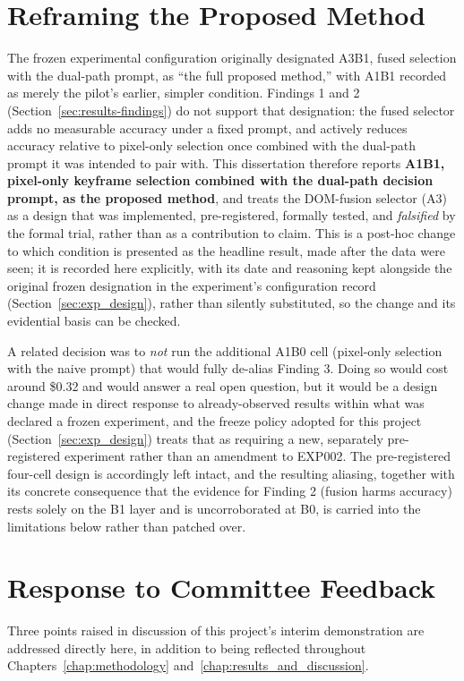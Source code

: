 \section{Reframing the Proposed Method}
\label{sec:results-decisions}
The frozen experimental configuration originally designated A3B1, fused selection with the dual-path prompt, as ``the full proposed method,'' with A1B1 recorded as merely the pilot's earlier, simpler condition. Findings 1 and 2 (Section~\ref{sec:results-findings}) do not support that designation: the fused selector adds no measurable accuracy under a fixed prompt, and actively reduces accuracy relative to pixel-only selection once combined with the dual-path prompt it was intended to pair with. This dissertation therefore reports \textbf{A1B1, pixel-only keyframe selection combined with the dual-path decision prompt, as the proposed method}, and treats the DOM-fusion selector (A3) as a design that was implemented, pre-registered, formally tested, and \emph{falsified} by the formal trial, rather than as a contribution to claim. This is a post-hoc change to which condition is presented as the headline result, made after the data were seen; it is recorded here explicitly, with its date and reasoning kept alongside the original frozen designation in the experiment's configuration record (Section~\ref{sec:exp_design}), rather than silently substituted, so the change and its evidential basis can be checked.

A related decision was to \emph{not} run the additional A1B0 cell (pixel-only selection with the naive prompt) that would fully de-alias Finding 3. Doing so would cost around \$0.32 and would answer a real open question, but it would be a design change made in direct response to already-observed results within what was declared a frozen experiment, and the freeze policy adopted for this project (Section~\ref{sec:exp_design}) treats that as requiring a new, separately pre-registered experiment rather than an amendment to EXP002. The pre-registered four-cell design is accordingly left intact, and the resulting aliasing, together with its concrete consequence that the evidence for Finding 2 (fusion harms accuracy) rests solely on the B1 layer and is uncorroborated at B0, is carried into the limitations below rather than patched over.

\section{Response to Committee Feedback}
\label{sec:results-feedback}
Three points raised in discussion of this project's interim demonstration are addressed directly here, in addition to being reflected throughout Chapters~\ref{chap:methodology} and~\ref{chap:results_and_discussion}.

